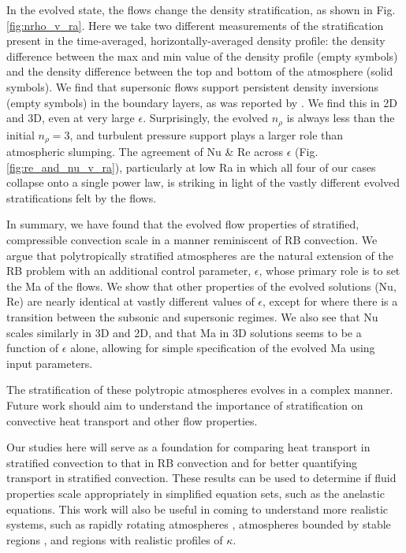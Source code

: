 \documentclass[aps, prl, twocolumn, nofootinbib, groupedaddress, amsfonts, amssymb, amsmath]{revtex4-1}
\begin{document}
In the evolved state, the flows change the density stratification,
as shown in Fig. \ref{fig:nrho_v_ra}.
Here we take two different measurements of the stratification present in the
time-averaged, horizontally-averaged density profile: the density difference
between the max and min value of the density profile (empty symbols) and the
density difference between the top and bottom of the atmosphere (solid symbols).
We find that supersonic flows support persistent density inversions (empty symbols)
in the boundary layers, as
was reported by \cite{brandenburg&all2005}.  We find this in 2D and 3D, even
at very large $\epsilon$.
Surprisingly, the evolved $n_\rho$ is always less than the initial $n_\rho = 3$,
and turbulent pressure support plays a larger role than atmospheric slumping.
The agreement of Nu \& Re across $\epsilon$ (Fig. \ref{fig:re_and_nu_v_ra}), 
particularly at low Ra in which all four of our cases collapse onto a single
power law, is striking in light of the vastly different evolved stratifications
felt by the flows. 


In summary, we have found that the evolved flow properties of stratified,
compressible convection scale in a manner reminiscent of RB convection.
We argue that polytropically stratified atmospheres are the natural
extension of the RB problem with an additional control parameter, $\epsilon$,
whose primary role is to set the Ma of the flows.  We show that other properties
of the evolved solutions (Nu, Re) are nearly identical at vastly different values
of $\epsilon$, except for where there is a transition between the subsonic
and supersonic regimes.  We also see that Nu scales similarly in 3D and 2D,
and that Ma in 3D solutions seems to be a function of $\epsilon$ alone,
allowing for simple specification of the evolved Ma using input parameters.

The stratification of 
these polytropic atmospheres evolves in a complex
manner.  Future work should aim to 
understand the importance of stratification on
convective heat transport and other flow properties.

Our studies here will serve as a foundation for 
comparing heat transport in stratified convection
to that in RB convection \cite{johnston&doering2009}
and for better quantifying transport in stratified convection.  
These results can be used to determine if fluid properties
scale appropriately in simplified equation sets, 
such as the anelastic equations.
This work will also be useful in coming to understand more realistic systems, 
such as rapidly rotating atmospheres \cite{julien&all2012},
atmospheres bounded by stable regions \cite{hurlburt&all1986}, 
and regions with realistic profiles of $\kappa$.
\end{document}
